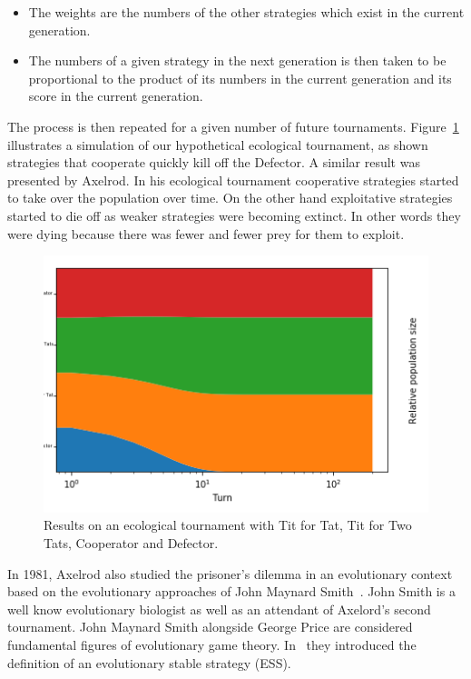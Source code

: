 \documentclass{article}
\theoremstyle{definition}
\begin{document}
\begin{itemize}
    \item The weights are the numbers of the other strategies which
    exist in the current generation.
    \item The numbers of a given strategy in the next generation is then taken to
    be proportional to the product of its numbers in the current generation and
    its score in the current generation.
\end{itemize}

The process is then repeated for a given number of future tournaments.
Figure~\ref{fig:ecological_tournament} illustrates a simulation of our hypothetical
ecological tournament, as shown strategies that cooperate quickly kill off the Defector.
A similar result was presented by Axelrod. In his ecological tournament cooperative
strategies started to take over the population over time. On the other hand exploitative
strategies started to die off as weaker strategies were becoming extinct. In other
words they were dying because there was fewer and fewer prey for them to exploit.

\begin{figure}[!hbtp]
    \centering
    \includegraphics[width=.6\textwidth]{./assets/images/ecological_tournament.png}
    \caption{Results on an ecological tournament with Tit for Tat, Tit for Two Tats,
    Cooperator and Defector.}
    \label{fig:ecological_tournament}
\end{figure}

In 1981, Axelrod also studied the prisoner's dilemma in an evolutionary context based
on the evolutionary approaches of John Maynard Smith~\cite{Smith1973,
Smith1974, Smith1979}. John Smith is a well know evolutionary biologist as well
as an attendant of Axelord's second tournament. John Maynard Smith alongside George Price
are considered fundamental figures of evolutionary game theory. In~\cite{Smith1973}
they introduced the definition of an evolutionary stable strategy (ESS).
\end{document}

